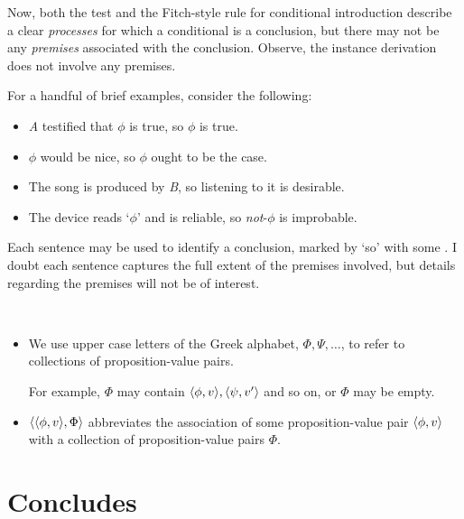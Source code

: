 \begin{note}
{    Now, both the \citeauthor{Ramsey:1929tf} test and the Fitch-style rule for conditional introduction describe a clear \emph{processes} for which a conditional is a conclusion, but there may not be any \emph{premises} associated with the conclusion.
    Observe, the instance derivation does not involve any premises.
  }


  For a handful of brief examples, consider the following:

  \begin{itemize}[noitemsep]
  \item
    \emph{A} testified that \(\phi\) is true, so \(\phi\) is true.
  \item
    \(\phi\) would be nice, so \(\phi\) ought to be the case.
  \item
    The song is produced by \emph{B}, so listening to it is desirable.
  \item
    The device reads `\(\phi\)' and is reliable, so \emph{not}-\(\phi\) is improbable.
  \end{itemize}

  Each sentence may be used to identify a conclusion, marked by `so' with some \pool{}.
  I doubt each sentence captures the full extent of the premises involved, but details regarding the premises will not be of interest.
\end{note}

\begin{note}
  \begin{notation}[\pool{3}]
    \mbox{ }
    \vspace{-\baselineskip}
    \begin{itemize}
    \item
      We use upper case letters of the Greek alphabet, \(\Phi, \Psi, \dots\), to refer to collections of proposition-value pairs.

      For example, \(\Phi\) may contain \(\langle \phi, v \rangle, \langle \psi, v' \rangle\) and so on, or \(\Phi\) may be empty.

    \item
      \(\langle \langle \phi, v \rangle, \Phi \rangle\) abbreviates the association of some proposition-value pair \(\langle \phi, v \rangle\) with a collection of proposition-value pairs \(\Phi\).
    \end{itemize}
  \end{notation}
\end{note}



\section{Concludes}
\label{cha:clar:sec:Concls}

